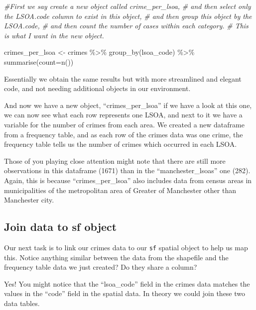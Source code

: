 \documentclass[
]{book}
\newenvironment{Shaded}{\begin{snugshade}}{\end{snugshade}}
\newcommand{\AttributeTok}[1]{\textcolor[rgb]{0.77,0.63,0.00}{#1}}
\newcommand{\CommentTok}[1]{\textcolor[rgb]{0.56,0.35,0.01}{\textit{#1}}}
\newcommand{\FunctionTok}[1]{\textcolor[rgb]{0.00,0.00,0.00}{#1}}
\newcommand{\NormalTok}[1]{#1}
\newcommand{\OtherTok}[1]{\textcolor[rgb]{0.56,0.35,0.01}{#1}}
\newcommand{\SpecialCharTok}[1]{\textcolor[rgb]{0.00,0.00,0.00}{#1}}
\begin{document}
\begin{Shaded}
\begin{Highlighting}[]
\CommentTok{\#First we say create a new object called crime\_per\_lsoa, }
\CommentTok{\# and then select only the LSOA.code column to exist in this object, }
\CommentTok{\# and then group this object by the LSOA.code, }
\CommentTok{\# and then count the number of cases within each category. }
\CommentTok{\# This is what I want in the new object.}

\NormalTok{crimes\_per\_lsoa }\OtherTok{\textless{}{-}}\NormalTok{ crimes }\SpecialCharTok{\%\textgreater{}\%}
  \FunctionTok{group\_by}\NormalTok{(lsoa\_code) }\SpecialCharTok{\%\textgreater{}\%}
  \FunctionTok{summarise}\NormalTok{(}\AttributeTok{count=}\FunctionTok{n}\NormalTok{())}
\end{Highlighting}
\end{Shaded}

Essentially we obtain the same results but with more streamlined and elegant code, and not needing additional objects in our environment.

And now we have a new object, ``crimes\_per\_lsoa'' if we have a look at this one, we can now see what each row represents one LSOA, and next to it we have a variable for the number of crimes from each area. We created a new dataframe from a frequency table, and as each row of the crimes data was one crime, the frequency table tells us the number of crimes which occurred in each LSOA.

Those of you playing close attention might note that there are still more observations in this dataframe (1671) than in the ``manchester\_lsoas'' one (282). Again, this is because ``crimes\_per\_lsoa'' also includes data from census areas in municipalities of the metropolitan area of Greater of Manchester other than Manchester city.

\hypertarget{join-data-to-sf-object}{%
\subsection{Join data to sf object}\label{join-data-to-sf-object}}

Our next task is to link our crimes data to our \texttt{sf} spatial object to help us map this. Notice anything similar between the data from the shapefile and the frequency table data we just created? Do they share a column?

Yes! You might notice that the ``lsoa\_code'' field in the crimes data matches the values in the ``code'' field in the spatial data. In theory we could join these two data tables.
\end{document}

